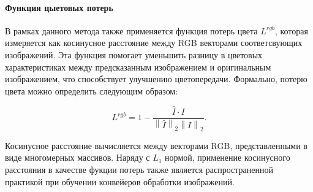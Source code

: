\paragraph{Функция цыетовых потерь}

В рамках данного метода также применяется функция потерь цвета $L^{rgb}$, которая измеряется как косинусное расстояние между RGB векторами соответсвующих изображений. Эта функция помогает уменьшить разницу в цветовых характеристиках между предсказанным изображением и оригинальным изображением, что способствует улучшению цветопередачи. Формально, потерю цвета можно определить следующим образом:

\begin{equation}
    \label{eq:2-1-3-4}
    L^{rgb} = 1 - \frac{\hat{I} \cdot I}{\left\|\hat{I}\right\|_2 \left\|I\right\|_2}.
\end{equation}

Косинусное расстояние вычисляется между векторами RGB, представленными в виде многомерных массивов. Наряду с $L_1$ нормой, применение косинусного расстояния в качестве фукции потерь также является распространенной практикой при обучении конвейеров обработки изображений.
